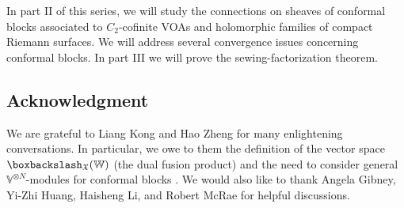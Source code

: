 \documentclass[11pt,b5paper,notitlepage]{article}
\theoremstyle{definition}
\theoremstyle{plain}
\newcommand{\Vbb}{\mathbb V}
\newcommand{\Wbb}{\mathbb W}
\newcommand{\<}{\left\langle}
\renewcommand{\>}{\right\rangle}
\newcommand{\fx}{\mathfrak{X}}
\newcommand{\bbs}{\boxbackslash}
\numberwithin{equation}{subsection}
\begin{document}
In part II of this series, we will study the connections on sheaves of conformal blocks associated to $C_2$-cofinite VOAs and holomorphic families of compact Riemann surfaces. We will address several convergence issues concerning conformal blocks. In part III we will prove the sewing-factorization theorem.


\subsection*{Acknowledgment}


We are grateful to Liang Kong and Hao Zheng for many enlightening conversations. In particular, we owe to them the definition of the vector space $\bbs_\fx(\Wbb)$ (the dual fusion product) and the need to consider general $\Vbb^{\otimes N}$-modules for conformal blocks \cite{KZ-conformal-block}. We would also like to thank Angela Gibney, Yi-Zhi Huang, Haisheng Li, and Robert McRae for helpful discussions.
\end{document}
